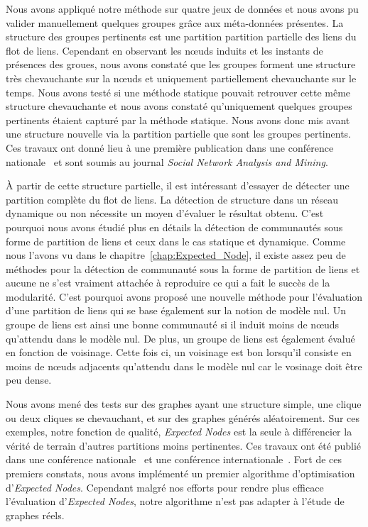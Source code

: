 Nous avons appliqué notre méthode sur quatre jeux de données et nous avons pu valider manuellement quelques groupes grâce aux méta-données présentes.
La structure des groupes pertinents est une partition partition partielle des liens du flot de liens.
Cependant en observant les n\oe uds induits et les instants de présences des groues, nous avons constaté que les groupes forment une structure très chevauchante sur la n\oe uds et uniquement partiellement chevauchante sur le temps.
Nous avons testé si une méthode statique pouvait retrouver cette même structure chevauchante et nous avons constaté qu'uniquement quelques groupes pertinents étaient capturé par la méthode statique.
Nous avons donc mis avant une structure nouvelle via la partition partielle que sont les groupes pertinents.
Ces travaux ont donné lieu à une première publication dans une conférence nationale~\cite{Gaumont2016} et sont soumis au journal \emph{Social Network Analysis and Mining}.


\bigskip

\`A partir de cette structure partielle, il est intéressant d'essayer de détecter une partition complète du flot de liens.
La détection de structure dans un réseau dynamique ou non nécessite un moyen d'évaluer le résultat obtenu.
C'est pourquoi nous avons étudié plus en détails la détection de communautés sous forme de partition de liens et ceux dans le cas statique et dynamique.
Comme nous l'avons vu dans le chapitre~\ref{chap:Expected_Node}, il existe assez peu de méthodes pour la détection de communauté sous la forme de partition de liens et aucune ne s'est vraiment attachée à reproduire ce qui a fait le succès de la modularité.
C'est pourquoi avons proposé une nouvelle méthode pour l'évaluation d'une partition de liens qui se base également sur la notion de modèle nul.
Un groupe de liens est ainsi une bonne communauté si il induit moins de n\oe uds qu'attendu dans le modèle nul.
De plus, un groupe de liens est également évalué en fonction de voisinage.
Cette fois ci, un voisinage est bon lorsqu'il consiste en moins de n\oe uds adjacents qu'attendu dans le modèle nul car le vosinage doit être peu dense.

Nous avons mené des tests sur des graphes ayant une structure simple, une clique ou deux cliques se chevauchant, et sur des graphes générés aléatoirement.
Sur ces exemples, notre fonction de qualité, \emph{Expected Nodes} est la seule à différencier la vérité de terrain d'autres partitions moins pertinentes.
Ces travaux ont été publié dans une conférence nationale~\cite{Gaumont2014} et une conférence internationale~\cite{Gaumont2015}.
Fort de ces premiers constats, nous avons implémenté un premier algorithme d'optimisation d'\emph{Expected Nodes}.
Cependant malgré nos efforts pour rendre plus efficace l'évaluation d'\emph{Expected Nodes}, notre algorithme n'est pas adapter à l'étude de graphes réels.

